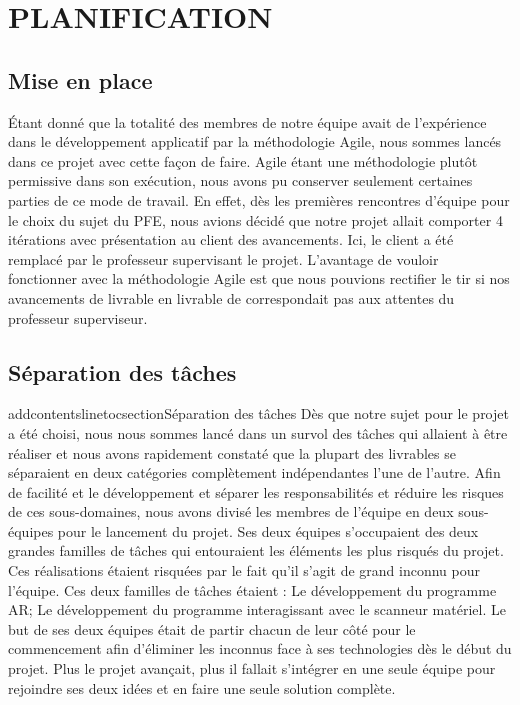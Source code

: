 \documentclass[rapport.tex]{subfiles}
\begin{document}
\chapter*{\uppercase{Planification}}
\section*{Mise en place}
Étant donné que la totalité des membres de notre équipe avait de l’expérience dans le développement applicatif par la méthodologie Agile, nous sommes lancés dans ce projet avec cette façon de faire. Agile étant une méthodologie plutôt permissive dans son exécution, nous avons pu conserver seulement certaines parties de ce mode de travail. En effet, dès les premières rencontres d’équipe pour le choix du sujet du PFE, nous avions décidé que notre projet allait comporter 4 itérations avec présentation au client des avancements. Ici, le client a été remplacé par le professeur supervisant le projet. L’avantage de vouloir fonctionner avec la méthodologie Agile est que nous pouvions rectifier le tir si nos avancements de livrable en livrable de correspondait pas aux attentes du professeur superviseur.
\section*{Séparation des tâches}
addcontentsline{toc}{section}{Séparation des tâches}
Dès que notre sujet pour le projet a été choisi, nous nous sommes lancé dans un survol des tâches qui allaient à être réaliser et nous avons rapidement constaté que la plupart des livrables se séparaient en deux catégories complètement indépendantes l’une de l’autre. Afin de facilité et le développement et séparer les responsabilités et réduire les risques de ces sous-domaines, nous avons divisé les membres de l’équipe en deux sous-équipes pour le lancement du projet. Ses deux équipes s’occupaient des deux grandes familles de tâches qui entouraient les éléments les plus risqués du projet. Ces réalisations étaient risquées par le fait qu’il s’agit de grand inconnu pour l’équipe. Ces deux familles de tâches étaient : Le développement du programme AR; Le développement du programme interagissant avec le scanneur matériel. Le but de ses deux équipes était de partir chacun de leur côté pour le commencement afin d’éliminer les inconnus face à ses technologies dès le début du projet. Plus le projet avançait, plus il fallait s’intégrer en une seule équipe pour rejoindre ses deux idées et en faire une seule solution complète.
\end{document}
